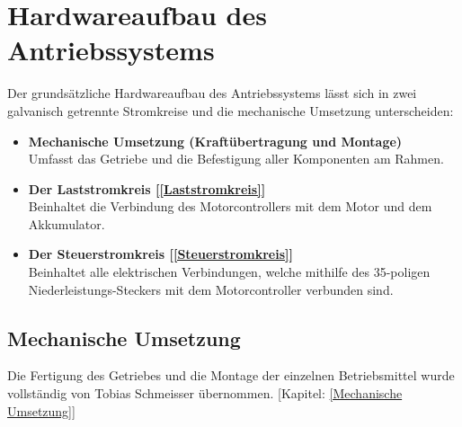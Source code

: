 \newpage

\section{Hardwareaufbau des Antriebssystems}
Der grundsätzliche Hardwareaufbau des Antriebssystems lässt sich in zwei galvanisch getrennte Stromkreise und die mechanische Umsetzung unterscheiden:
\\[5mm]
\begin{itemize}
	\item \textbf{Mechanische Umsetzung (Kraftübertragung und Montage)} 
	\\ \medskip Umfasst das Getriebe und die Befestigung aller Komponenten am Rahmen.
	\medskip
	\item \textbf{Der Laststromkreis [\ref{Laststromkreis}]}
	\\ \medskip Beinhaltet die Verbindung des Motorcontrollers mit dem Motor und dem Akkumulator.
	\medskip
	\item \textbf{Der Steuerstromkreis [\ref{Steuerstromkreis}]}
	\\ \medskip Beinhaltet alle elektrischen Verbindungen, welche mithilfe des 35-poligen
	\\ Niederleistungs-Steckers mit dem Motorcontroller verbunden sind.
\end{itemize}

\vspace{10mm}

\subsection{Mechanische Umsetzung}
Die Fertigung des Getriebes und die Montage der einzelnen Betriebsmittel wurde vollständig von Tobias Schmeisser übernommen. [Kapitel: \ref{Mechanische Umsetzung}]


\newpage



